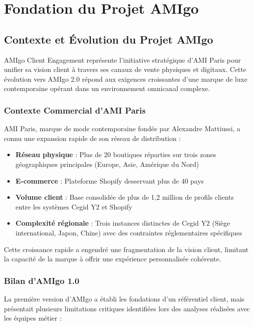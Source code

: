 
\chapter{Fondation du Projet AMIgo}

\section{Contexte et Évolution du Projet AMIgo}

AMIgo Client Engagement représente l'initiative stratégique d'AMI Paris pour unifier sa vision client à travers ses canaux de vente physiques et digitaux. Cette évolution vers AMIgo 2.0 répond aux exigences croissantes d'une marque de luxe contemporaine opérant dans un environnement omnicanal complexe.

\subsection{Contexte Commercial d'AMI Paris}

AMI Paris, marque de mode contemporaine fondée par Alexandre Mattiussi, a connu une expansion rapide de son réseau de distribution :

\begin{itemize}
    \item \textbf{Réseau physique} : Plus de 20 boutiques réparties sur trois zones géographiques principales (Europe, Asie, Amérique du Nord)
    \item \textbf{E-commerce} : Plateforme Shopify desservant plus de 40 pays
    \item \textbf{Volume client} : Base consolidée de plus de 1,2 million de profils clients entre les systèmes Cegid Y2 et Shopify
    \item \textbf{Complexité régionale} : Trois instances distinctes de Cegid Y2 (Siège international, Japon, Chine) avec des contraintes réglementaires spécifiques
\end{itemize}

Cette croissance rapide a engendré une fragmentation de la vision client, limitant la capacité de la marque à offrir une expérience personnalisée cohérente.

\subsection{Bilan d'AMIgo 1.0}

La première version d'AMIgo a établi les fondations d'un référentiel client, mais présentait plusieurs limitations critiques identifiées lors des analyses réalisées avec les équipes métier :

